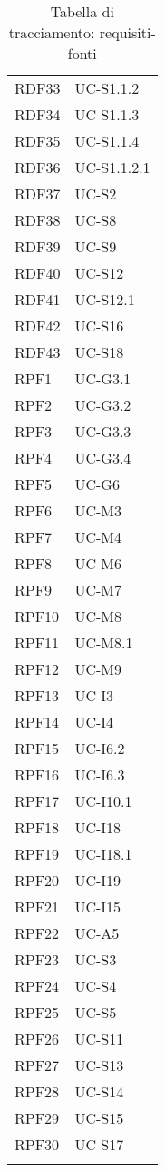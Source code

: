 \begin{longtable}{| p{5cm} | p{5cm} |}
		RDF33 & UC-S1.1.2\\
		\rowcolor{LightGray}
		RDF34 & UC-S1.1.3\\%
		RDF35 & UC-S1.1.4\\		%
		\rowcolor{LightGray}
		RDF36 & UC-S1.1.2.1 \\
		RDF37 & UC-S2\\
		\rowcolor{LightGray}
		RDF38 & UC-S8\\
		RDF39 & UC-S9\\
		\rowcolor{LightGray}
		RDF40 & UC-S12 \\
		RDF41 & UC-S12.1 \\
		\rowcolor{LightGray}
		RDF42 & UC-S16\\
		RDF43 & UC-S18\\		%
		\rowcolor{LightGray}
		RPF1 & UC-G3.1\\
		RPF2 & UC-G3.2\\
		\rowcolor{LightGray}
		RPF3 & UC-G3.3\\
		RPF4 & UC-G3.4\\
		\rowcolor{LightGray}
		RPF5 & UC-G6\\
		RPF6 & UC-M3\\
		\rowcolor{LightGray}
		RPF7 & UC-M4\\
		RPF8 & UC-M6\\
		\rowcolor{LightGray}
		RPF9 & UC-M7\\
		RPF10 & UC-M8\\
		\rowcolor{LightGray}
		RPF11 & UC-M8.1\\
		RPF12 & UC-M9\\
		\rowcolor{LightGray}
		RPF13 & UC-I3\\
		RPF14 & UC-I4\\
		\rowcolor{LightGray}
		RPF15 & UC-I6.2\\
		RPF16 & UC-I6.3\\
		\rowcolor{LightGray}
		RPF17 & UC-I10.1\\
		RPF18 & UC-I18\\
		\rowcolor{LightGray}
		RPF19 & UC-I18.1\\
		RPF20 & UC-I19\\	
		\rowcolor{LightGray}
		RPF21 & UC-I15\\
		RPF22 & UC-A5\\
		\rowcolor{LightGray}
		RPF23 & UC-S3\\
		RPF24 & UC-S4\\
		\rowcolor{LightGray}
		RPF25 & UC-S5\\
		RPF26 & UC-S11\\
		\rowcolor{LightGray}
		RPF27 & UC-S13\\
		RPF28 & UC-S14\\	
		\rowcolor{LightGray}
		RPF29 & UC-S15\\
		RPF30 & UC-S17\\
		\hline
		\caption{Tabella di tracciamento: requisiti-fonti}
\end{longtable}

